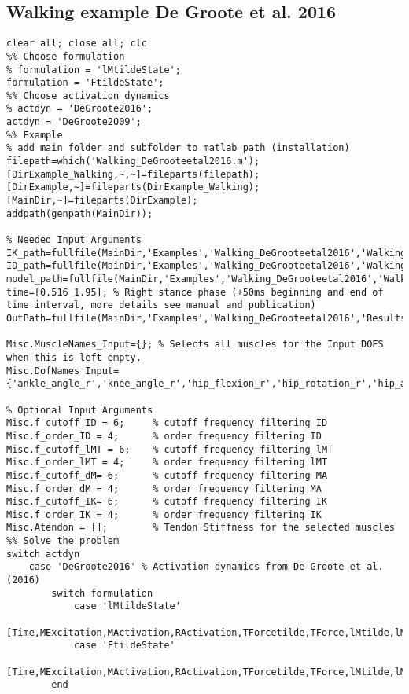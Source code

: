 \documentclass[a4paper,oneside,11pt]{article}
\begin{document}
\subsection{Walking example De Groote et al. 2016}
\begin{lstlisting}[frame=none,basicstyle=\tiny]
clear all; close all; clc
%% Choose formulation
% formulation = 'lMtildeState';
formulation = 'FtildeState';
%% Choose activation dynamics
% actdyn = 'DeGroote2016';
actdyn = 'DeGroote2009';
%% Example
% add main folder and subfolder to matlab path (installation)
filepath=which('Walking_DeGrooteetal2016.m');
[DirExample_Walking,~,~]=fileparts(filepath); [DirExample,~]=fileparts(DirExample_Walking);[MainDir,~]=fileparts(DirExample);
addpath(genpath(MainDir));

% Needed Input Arguments
IK_path=fullfile(MainDir,'Examples','Walking_DeGrooteetal2016','WalkingData','inverse_kinematics.mot');
ID_path=fullfile(MainDir,'Examples','Walking_DeGrooteetal2016','WalkingData','inverse_dynamics.sto');
model_path=fullfile(MainDir,'Examples','Walking_DeGrooteetal2016','WalkingData','subject01.osim');
time=[0.516 1.95]; % Right stance phase (+50ms beginning and end of time interval, more details see manual and publication)
OutPath=fullfile(MainDir,'Examples','Walking_DeGrooteetal2016','Results');

Misc.MuscleNames_Input={}; % Selects all muscles for the Input DOFS when this is left empty.
Misc.DofNames_Input={'ankle_angle_r','knee_angle_r','hip_flexion_r','hip_rotation_r','hip_adduction_r'};

% Optional Input Arguments
Misc.f_cutoff_ID = 6;     % cutoff frequency filtering ID
Misc.f_order_ID = 4;      % order frequency filtering ID
Misc.f_cutoff_lMT = 6;    % cutoff frequency filtering lMT
Misc.f_order_lMT = 4;     % order frequency filtering lMT
Misc.f_cutoff_dM= 6;      % cutoff frequency filtering MA
Misc.f_order_dM = 4;      % order frequency filtering MA
Misc.f_cutoff_IK= 6;      % cutoff frequency filtering IK
Misc.f_order_IK = 4;      % order frequency filtering IK
Misc.Atendon = [];        % Tendon Stiffness for the selected muscles
%% Solve the problem
switch actdyn
    case 'DeGroote2016' % Activation dynamics from De Groote et al. (2016)      
        switch formulation
            case 'lMtildeState'
                [Time,MExcitation,MActivation,RActivation,TForcetilde,TForce,lMtilde,lM,MuscleNames,OptInfo,DatStore]=SolveMuscleRedundancy_lMtildeState(model_path,IK_path,ID_path,time,OutPath,Misc);
            case 'FtildeState'   
                [Time,MExcitation,MActivation,RActivation,TForcetilde,TForce,lMtilde,lM,MuscleNames,OptInfo,DatStore]=SolveMuscleRedundancy_FtildeState(model_path,IK_path,ID_path,time,OutPath,Misc);
        end
        

\end{lstlisting}
\end{document}
